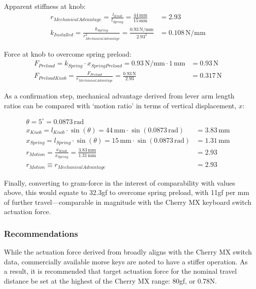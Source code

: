 \documentclass[10pt]{article}
\begin{document}
Apparent stiffness at knob:
\begin{align*}
	r_{MechanicalAdvantage} = \frac{l_{Knob}}{l_{Spring}} = \frac{44 \, \mathrm{mm}}{15 \, \mathrm{mm}}           & = 2.93                   \\
	k_{Installed}           = \frac{k_{Spring}}{r_{MechanicalAdvantage}^2} = \frac{0.93 \, \mathrm{N/mm}}{2.93^2} & = 0.108 \, \mathrm{N/mm}
\end{align*}

Force at knob to overcome spring preload:
\begin{align*}
	F_{Preload}       = k_{Spring} \cdot x_{SpringPreload} = 0.93 \, \mathrm{N/mm} \cdot 1 \, \mathrm{mm} & = 0.93 \, \mathrm{N}  \\
	F_{PreloadKnob}   = \frac{F_{Preload}}{r_{MechanicalAdvantage}} = \frac{0.93 \, \mathrm{N}}{2.93}     & = 0.317 \, \mathrm{N}
\end{align*}

As a confirmation step, mechanical advantage derived from lever arm length ratios can be compared
with `motion ratio' in terms of vertical displacement, $x$:

\begin{align*}
	\theta = 5^\circ = 0.0873 \, \mathrm{rad}                                                                                 \\
	x_{Knob} = l_{Knob} \cdot \sin(\theta) = 44 \, \mathrm{mm} \cdot \sin(0.0873 \, \mathrm{rad})     & = 3.83 \, \mathrm{mm} \\
	x_{Spring} = l_{Spring} \cdot \sin(\theta) = 15 \, \mathrm{mm} \cdot \sin(0.0873 \, \mathrm{rad}) & = 1.31 \, \mathrm{mm} \\
	r_{Motion} = \frac{x_{Knob}}{x_{Spring}} = \frac{3.83 \, \mathrm{mm}}{1.31 \, \mathrm{mm}}        & = 2.93                \\
	r_{Motion} \equiv{} r_{MechanicalAdvantage}                                                       & = 2.93
\end{align*}

Finally, converting to gram-force in the interest of comparability with values above, this would
equate to 32.3gf to overcome spring preload, with 11gf per mm of further travel---comparable in
magnitude with the Cherry MX keyboard switch actuation force.

\subsubsection{Recommendations}
While the actuation force derived from \cite{giangrandi2025} broadly aligns with the Cherry MX
switch data, commercially available morse keys are noted to have a stiffer operation. As a result,
it is recommended that target actuation force for the nominal travel distance be set at the highest
of the Cherry MX range: 80gf, or 0.78N.
\end{document}
